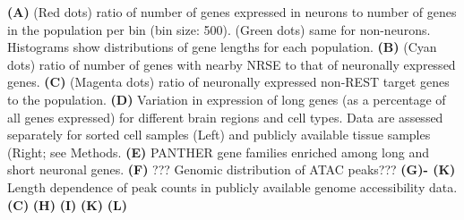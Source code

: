 \textbf{(A)} (Red dots) ratio of number of genes expressed in neurons to number of genes in the population per bin (bin size: 500). (Green dots) same for non-neurons. Histograms show distributions of gene lengths for each population. 
\textbf{(B)} (Cyan dots) ratio of number of genes with nearby NRSE to that of neuronally expressed genes. 
\textbf{(C)} (Magenta dots) ratio of neuronally expressed non-REST target genes to the population.
\textbf{(D)} Variation in expression of long genes (as a percentage of all genes expressed) for different brain regions and cell types. Data are assessed separately for sorted cell samples (Left) and publicly available tissue samples (Right; see Methods.
\textbf{(E)} PANTHER gene families enriched among long and short neuronal genes. 
\textbf{(F)} ??? Genomic distribution of ATAC peaks???
\textbf{(G)- (K)} Length dependence of peak counts in publicly available genome accessibility data.\textbf{(C)}
\textbf{(H)}
\textbf{(I)}
\textbf{(K)}
\textbf{(L)}